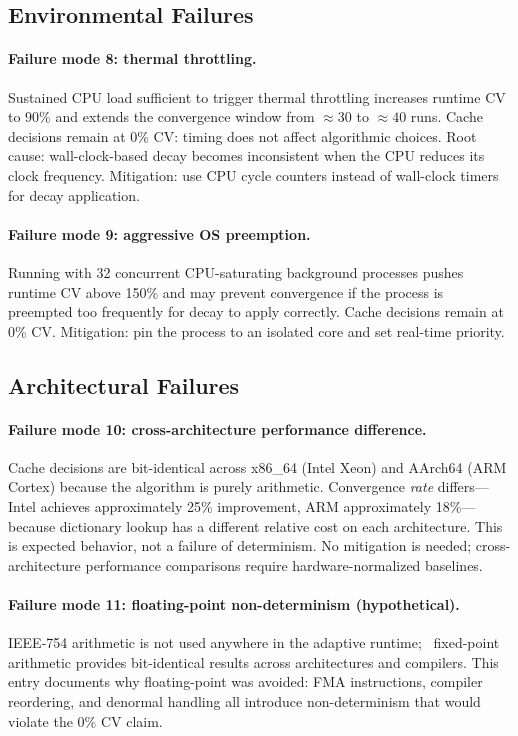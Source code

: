 \subsection{Environmental Failures}

\paragraph{Failure mode 8: thermal throttling.}
Sustained CPU load sufficient to trigger thermal throttling increases runtime
CV to 90\raisebox{0.5ex}{+}\% and extends the convergence window from
${\approx}30$ to ${\approx}40$ runs. Cache decisions remain at 0\% CV:
timing does not affect algorithmic choices. Root cause: wall-clock-based
decay becomes inconsistent when the CPU reduces its clock frequency.
Mitigation: use CPU cycle counters instead of wall-clock timers for
decay application.

\paragraph{Failure mode 9: aggressive OS preemption.}
Running with 32 concurrent CPU-saturating background processes pushes runtime
CV above 150\% and may prevent convergence if the process is preempted too
frequently for decay to apply correctly. Cache decisions remain at 0\% CV.
Mitigation: pin the process to an isolated core and set real-time priority.

\subsection{Architectural Failures}

\paragraph{Failure mode 10: cross-architecture performance difference.}
Cache decisions are bit-identical across x86\_64 (Intel Xeon) and AArch64
(ARM Cortex) because the algorithm is purely arithmetic. Convergence
\emph{rate} differs---Intel achieves approximately 25\% improvement, ARM
approximately 18\%---because dictionary lookup has a different relative cost
on each architecture. This is expected behavior, not a failure of
determinism. No mitigation is needed; cross-architecture performance
comparisons require hardware-normalized baselines.

\paragraph{Failure mode 11: floating-point non-determinism (hypothetical).}
IEEE-754 arithmetic is not used anywhere in the adaptive runtime; \Qtype\
fixed-point arithmetic provides bit-identical results across architectures
and compilers. This entry documents why floating-point was avoided: FMA
instructions, compiler reordering, and denormal handling all introduce
non-determinism that would violate the 0\% CV claim.

